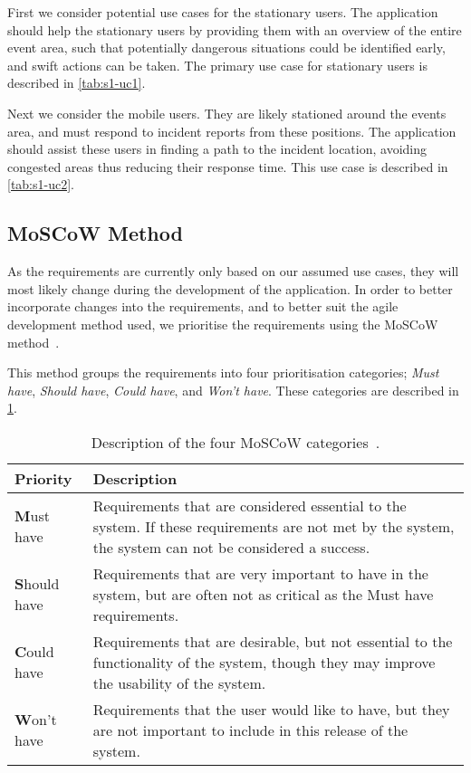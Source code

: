 First we consider potential use cases for the stationary users. The application should help the stationary users by providing them with an overview of the entire event area, such that potentially dangerous situations could be identified early, and swift actions can be taken. The primary use case for stationary users is described in \cref{tab:s1-uc1}.



Next we consider the mobile users. They are likely stationed around the events area, and must respond to incident reports from these positions. The application should assist these users in finding a path to the incident location, avoiding congested areas thus reducing their response time. This use case is described in \cref{tab:s1-uc2}.



\subsection{MoSCoW Method} \label{ss:s1_moscow}
As the requirements are currently only based on our assumed use cases, they will most likely change during the development of the application. In order to better incorporate changes into the requirements, and to better suit the agile development method used, we prioritise the requirements using the MoSCoW method~\cite{moscow}.

This method groups the requirements into four prioritisation categories; \emph{Must have}, \emph{Should have}, \emph{Could have}, and \emph{Won't have}. These categories are described in \cref{tab:moscow}.

\begin{table}[htbp]
	\centering
	\begin{tabularx}{\textwidth}{lX}
		\toprule
		\textbf{Priority} & \textbf{Description} \\
		\midrule
		\rowcolor[HTML]{EFEFEF} 
		\textbf{M}ust have & Requirements that are considered essential to the system. If these requirements are not met by the system, the system can not be considered a success. \\
		\textbf{S}hould have & Requirements that are very important to have in the system, but are often not as critical as the Must have requirements. \\
		\rowcolor[HTML]{EFEFEF} 
		\textbf{C}ould have & Requirements that are desirable, but not essential to the functionality of the system, though they may improve the usability of the system. \\
		\textbf{W}on't have & Requirements that the user would like to have, but they are not important to include in this release of the system. \\
		\bottomrule
	\end{tabularx}
	\caption{Description of the four MoSCoW categories~\cite{moscow}.}
	\label{tab:moscow}
\end{table}

